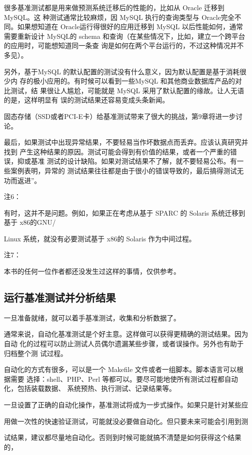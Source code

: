 很多基准测试都是用来做预测系统迁移后的性能的，比如从 Oracle 迁移到MySQL。这
种测试通常比较麻烦，因 MySQL 执行的查询类型与 Oracle完全不同。如果想知道在
Oracle运行得很好的应用迁移到 MySQL 以后性能如何，通常需要重新设计 MySQL的
schema 和查询（在某些情况下，比如，建立一个跨平台的应用时，可能想知道同一条查
询是如何在两个平台运行的，不过这种情况并不多见）。

另外，基于MySQL 的默认配置的测试没有什么意义，因为默认配置是基于消耗很少内
存的极小应用的。有时候可以看到一些MySQL 和其他商业数据库产品的对比测试，结
果很让人尴尬，可能就是 MySQL 采用了默认配置的缘故。让人无语的是，这样明显有
误的测试结果还容易变成头条新闻。

固态存储（SSD或者PCI-E卡）给基准测试带来了很大的挑战，第9章将进一步讨论。

最后，如果测试中出现异常结果，不要轻易当作坏数据点而丢弃。应该认真研究并找到
产生这种结果的原因。测试可能会得到有价值的结果，或者一个严重的错误，抑或基准
测试的设计缺陷。如果对测试结果不了解，就不要轻易公布。有一些案例表明，异常的
测试结果往往都是由于很小的错误导致的，最后搞得测试无功而返进”。

注6：

有时，这并不是问题。例如，如果正在考虑从基于 SPARC 的 Solaris 系统迁移到基于 x86的GNU/

Linux 系统，就没有必要测试基于 x86的 Solaris 作为中间过程。

注7：

本书的任何一位作者都还没发生过这样的事情，仅供参考。

\subsection{运行基准测试并分析结果}
一旦准备就绪，就可以着手基准测试，收集和分析数据了。

通常来说，自动化基准测试是个好主意。这样做可以获得更精确的测试结果。因为自动
化的过程可以防止测试人员偶尔遗漏某些步骤，或者误操作。另外也有助于归档整个测
试过程。

自动化的方式有很多，可以是一个 Makefile 文件或者一组脚本。脚本语言可以根据需要
选择：shell、PHP、Perl 等都可以。要尽可能地使所有测试过程都自动化，包括装载数据、
系统预热、执行测试、记录结果等。

一旦设置了正确的自动化操作，基准测试将成为一步式操作。如果只是针对某些应

用做一次性的快速验证测试，可能就没必要做自动化。但只要未来可能会引用到测

试结果，建议都尽量地自动化。否则到时候可能就搞不清楚是如何获得这个结果的，

